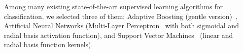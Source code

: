 \documentclass[10pt,twocolumn,letterpaper]{article}
\begin{document}
Among many existing state-of-the-art supervised learning algorithms for classification, we selected three of them: Adaptive Boosting (gentle version)~\cite{freund1999short}, Artificial Neural Networks (Multi-Layer Perceptron~\cite{rosenblatt1961principles} with both sigmoidal and radial basis activation function), and Support Vector Machines~\cite{cortes1995support} (linear and radial basis function kernels).

%
%
\end{document}
